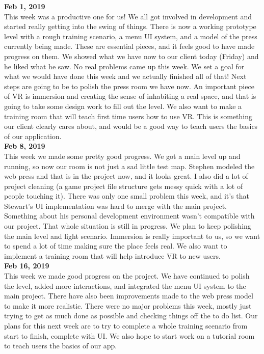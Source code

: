 \textbf{Feb 1, 2019}\\
This week was a productive one for us! We all got involved in development and started really getting into the swing of things. There is now a working prototype level with a rough training scenario, a menu UI system, and a model of the press currently being made. These are essential pieces, and it feels good to have made progress on them. We showed what we have now to our client today (Friday) and he liked what he saw.
No real problems came up this week. We set a goal for what we would have done this week and we actually finished all of that!
Next steps are going to be to polish the press room we have now. An important piece of VR is immersion and creating the sense of inhabiting a real space, and that is going to take some design work to fill out the level. We also want to make a training room that will teach first time users how to use VR. This is something our client clearly cares about, and would be a good way to teach users the basics of our application.\\

\textbf{Feb 8, 2019}\\
This week we made some pretty good progress. We got a main level up and running, so now our room is not just a sad little test map. Stephen modeled the web press and that is in the project now, and it looks great. I also did a lot of project cleaning (a game project file structure gets messy quick with a lot of people touching it).
There was only one small problem this week, and it’s that Stewart’s UI implementation was hard to merge with the main project. Something about his personal development environment wasn’t compatible with our project. That whole situation is still in progress.
We plan to keep polishing the main level and light scenario. Immersion is really important to us, so we want to spend a lot of time making sure the place feels real. We also want to implement a training room that will help introduce VR to new users.\\

\textbf{Feb 16, 2019}\\
This week we made good progress on the project. We have continued to polish the level, added more interactions, and integrated the menu UI system to the main project. There have also been improvements made to the web press model to make it more realistic.
There were no major problems this week, mostly just trying to get as much done as possible and checking things off the to do list.
Our plans for this next week are to try to complete a whole training scenario from start to finish, complete with UI. We also hope to start work on a tutorial room to teach users the basics of our app.\\

